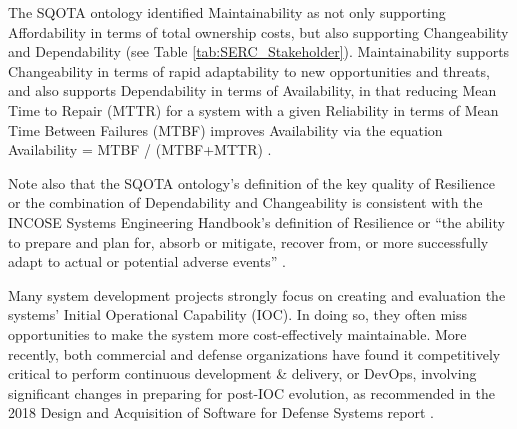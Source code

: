 The SQOTA ontology identified Maintainability as not only supporting Affordability in terms of total ownership costs, but also supporting Changeability and Dependability (see Table \ref{tab:SERC_Stakeholder}). Maintainability supports Changeability in terms of rapid adaptability to new opportunities and threats, and also supports Dependability in terms of Availability, in that reducing Mean Time to Repair (MTTR) for a system with a given Reliability in terms of Mean Time Between Failures (MTBF) improves Availability via the equation Availability = MTBF / (MTBF+MTTR) \citep{IIS2:IIS2278}.

Note also that the SQOTA ontology’s definition of the key quality of Resilience or the combination of Dependability and Changeability is consistent with the INCOSE Systems Engineering Handbook’s definition of Resilience or “the ability to prepare and plan for, absorb or mitigate, recover from, or more successfully adapt to actual or potential adverse events”
\citep{incose2015systems,haimes2012systems}.

Many system development projects strongly focus on creating and evaluation the systems’ Initial Operational Capability (IOC). In doing so, they often miss opportunities to make the system more cost-effectively maintainable. 
More recently, both commercial and defense organizations have found it competitively critical to perform continuous development \& delivery, or DevOps, involving significant changes in preparing for post-IOC evolution, as recommended in the 2018 Design and Acquisition of Software for Defense Systems report \citep{DefenseScienceBoard}.

